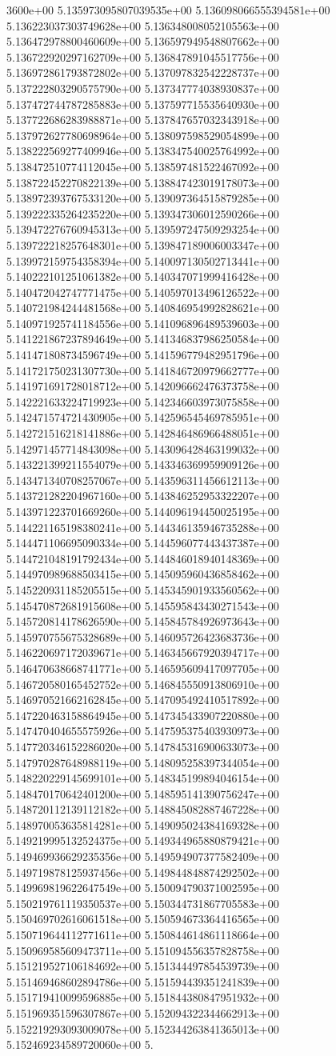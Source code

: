 3600e+00	5.135973095807039535e+00	5.136098066555394581e+00	5.136223037303749628e+00	5.136348008052105563e+00	5.136472978800460609e+00	5.136597949548807662e+00	5.136722920297162709e+00	5.136847891045517756e+00	5.136972861793872802e+00	5.137097832542228737e+00	5.137222803290575790e+00	5.137347774038930837e+00	5.137472744787285883e+00	5.137597715535640930e+00	5.137722686283988871e+00	5.137847657032343918e+00	5.137972627780698964e+00	5.138097598529054899e+00	5.138222569277409946e+00	5.138347540025764992e+00	5.138472510774112045e+00	5.138597481522467092e+00	5.138722452270822139e+00	5.138847423019178073e+00	5.138972393767533120e+00	5.139097364515879285e+00	5.139222335264235220e+00	5.139347306012590266e+00	5.139472276760945313e+00	5.139597247509293254e+00	5.139722218257648301e+00	5.139847189006003347e+00	5.139972159754358394e+00	5.140097130502713441e+00	5.140222101251061382e+00	5.140347071999416428e+00	5.140472042747771475e+00	5.140597013496126522e+00	5.140721984244481568e+00	5.140846954992828621e+00	5.140971925741184556e+00	5.141096896489539603e+00	5.141221867237894649e+00	5.141346837986250584e+00	5.141471808734596749e+00	5.141596779482951796e+00	5.141721750231307730e+00	5.141846720979662777e+00	5.141971691728018712e+00	5.142096662476373758e+00	5.142221633224719923e+00	5.142346603973075858e+00	5.142471574721430905e+00	5.142596545469785951e+00	5.142721516218141886e+00	5.142846486966488051e+00	5.142971457714843098e+00	5.143096428463199032e+00	5.143221399211554079e+00	5.143346369959909126e+00	5.143471340708257067e+00	5.143596311456612113e+00	5.143721282204967160e+00	5.143846252953322207e+00	5.143971223701669260e+00	5.144096194450025195e+00	5.144221165198380241e+00	5.144346135946735288e+00	5.144471106695090334e+00	5.144596077443437387e+00	5.144721048191792434e+00	5.144846018940148369e+00	5.144970989688503415e+00	5.145095960436858462e+00	5.145220931185205515e+00	5.145345901933560562e+00	5.145470872681915608e+00	5.145595843430271543e+00	5.145720814178626590e+00	5.145845784926973643e+00	5.145970755675328689e+00	5.146095726423683736e+00	5.146220697172039671e+00	5.146345667920394717e+00	5.146470638668741771e+00	5.146595609417097705e+00	5.146720580165452752e+00	5.146845550913806910e+00	5.146970521662162845e+00	5.147095492410517892e+00	5.147220463158864945e+00	5.147345433907220880e+00	5.147470404655575926e+00	5.147595375403930973e+00	5.147720346152286020e+00	5.147845316900633073e+00	5.147970287648988119e+00	5.148095258397344054e+00	5.148220229145699101e+00	5.148345199894046154e+00	5.148470170642401200e+00	5.148595141390756247e+00	5.148720112139112182e+00	5.148845082887467228e+00	5.148970053635814281e+00	5.149095024384169328e+00	5.149219995132524375e+00	5.149344965880879421e+00	5.149469936629235356e+00	5.149594907377582409e+00	5.149719878125937456e+00	5.149844848874292502e+00	5.149969819622647549e+00	5.150094790371002595e+00	5.150219761119350537e+00	5.150344731867705583e+00	5.150469702616061518e+00	5.150594673364416565e+00	5.150719644112771611e+00	5.150844614861118664e+00	5.150969585609473711e+00	5.151094556357828758e+00	5.151219527106184692e+00	5.151344497854539739e+00	5.151469468602894786e+00	5.151594439351241839e+00	5.151719410099596885e+00	5.151844380847951932e+00	5.151969351596307867e+00	5.152094322344662913e+00	5.152219293093009078e+00	5.152344263841365013e+00	5.152469234589720060e+00	5.